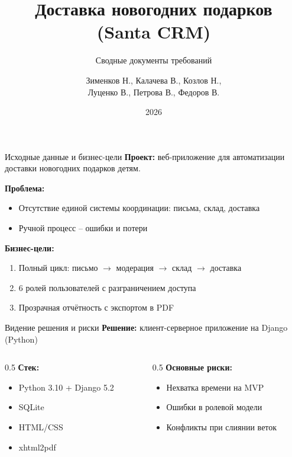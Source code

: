 \documentclass[aspectratio=169,14pt]{beamer}
\title{Доставка новогодних подарков\\(Santa CRM)}
\subtitle{Сводные документы требований}
\author{Зименков Н., Калачева В., Козлов Н.,\\Луценко В., Петрова В., Федоров В.}
\institute{Университет ИТМО, К3420/К3422/К3423}
\date{2026}
\begin{document}
\begin{frame}
\titlepage
\end{frame}

\begin{frame}{Исходные данные и бизнес-цели}
\textbf{Проект:} веб-приложение для автоматизации доставки новогодних подарков детям.

\vspace{0.3cm}
\textbf{Проблема:}
\begin{itemize}
    \item Отсутствие единой системы координации: письма, склад, доставка
    \item Ручной процесс -- ошибки и потери
\end{itemize}

\vspace{0.3cm}
\textbf{Бизнес-цели:}
\begin{enumerate}
    \item Полный цикл: письмо $\to$ модерация $\to$ склад $\to$ доставка
    \item 6 ролей пользователей с разграничением доступа
    \item Прозрачная отчётность с экспортом в PDF
\end{enumerate}
\end{frame}

\begin{frame}{Видение решения и риски}
\textbf{Решение:} клиент-серверное приложение на Django (Python)

\vspace{0.3cm}
\begin{columns}
\begin{column}{0.5\textwidth}
\textbf{Стек:}
\begin{itemize}
    \item Python 3.10 + Django 5.2
    \item SQLite
    \item HTML/CSS
    \item xhtml2pdf
\end{itemize}
\end{column}
\begin{column}{0.5\textwidth}
\textbf{Основные риски:}
\begin{itemize}
    \item Нехватка времени на MVP
    \item Ошибки в ролевой модели
    \item Конфликты при слиянии веток
\end{itemize}
\end{column}
\end{columns}
\end{frame}
\end{document}

